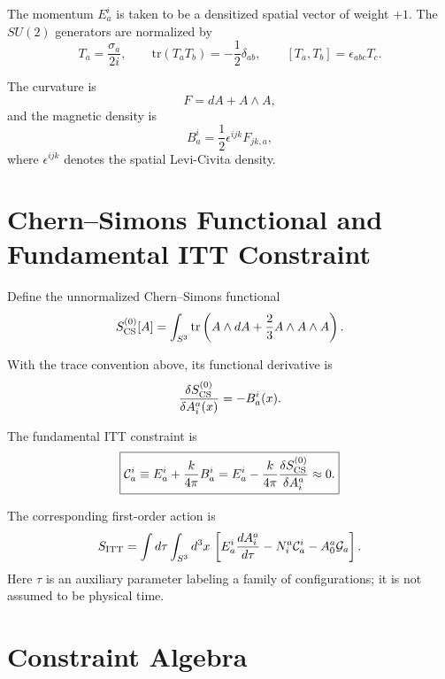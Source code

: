 \documentclass[11pt,a4paper]{article}
\begin{document}
The momentum $E_a^i$ is taken to be a densitized spatial vector of weight $+1$. The $SU(2)$ generators are normalized by
\begin{equation}
T_a=\frac{\sigma_a}{2i},
\qquad
\mathrm{tr}(T_aT_b)=-\frac12\delta_{ab},
\qquad
[T_a,T_b]=\epsilon_{abc}T_c.
\end{equation}

The curvature is
\begin{equation}
F=dA+A\wedge A,
\end{equation}
and the magnetic density is
\begin{equation}
B_a^i=\frac12\epsilon^{ijk}F_{jk,a},
\end{equation}
where $\epsilon^{ijk}$ denotes the spatial Levi-Civita density.

\section{Chern--Simons Functional and Fundamental ITT Constraint}

Define the unnormalized Chern--Simons functional
\begin{equation}
S_{\rm CS}^{(0)}[A]
=
\int_{S^3}\mathrm{tr}
\left(
A\wedge dA+\frac23A\wedge A\wedge A
\right).
\end{equation}

With the trace convention above, its functional derivative is
\begin{equation}
\frac{\delta S_{\rm CS}^{(0)}}{\delta A_i^a(x)}=-B_a^i(x).
\end{equation}

The fundamental ITT constraint is
\begin{equation}
\boxed{
\mathcal C_a^i
\equiv
E_a^i+\frac{k}{4\pi}B_a^i
=
E_a^i-
\frac{k}{4\pi}
\frac{\delta S_{\rm CS}^{(0)}}{\delta A_i^a}
\approx0.
}
\end{equation}

The corresponding first-order action is
\begin{equation}
S_{\rm ITT}
=
\int d\tau\int_{S^3}d^3x\,
\left[
E_a^i\frac{dA_i^a}{d\tau}
-N_i^a\mathcal C_a^i
-A_0^a\mathcal G_a
\right].
\end{equation}
Here $\tau$ is an auxiliary parameter labeling a family of configurations; it is not assumed to be physical time.

\section{Constraint Algebra}
\end{document}
